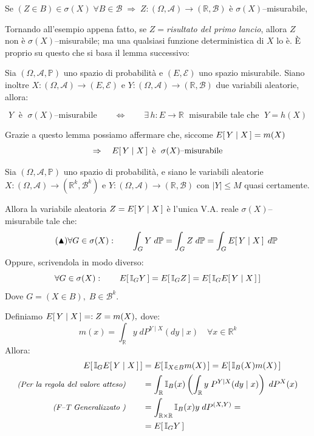 \begin{definizione}
    Se $(Z\in B)\in \sigma(X)\;\forall B\in\mathcal{B}\;\Rightarrow\;Z:(\Omega, \mathcal{A})\to (\mathbb{R}, \mathcal{B})$ è $\sigma(X)$--misurabile,
\end{definizione}

Tornando all'esempio appena fatto, se $Z=$\textit{risultato del primo lancio}, allora $Z$ non è $\sigma(X)$--misurabile; ma una qualsiasi funzione deterministica di $X$ lo è. È proprio su questo che si basa il lemma successivo:

\begin{lemma}
    Sia $(\Omega, \mathcal{A}, \mathbb{P})$ uno spazio di probabilità e $(E, \mathcal{E})$ uno spazio misurabile. Siano inoltre $X:(\Omega, \mathcal{A})\to(E, \mathcal{E})$ e $Y:(\Omega, \mathcal{A})\to(\mathbb{R}, \mathcal{B})$ due variabili aleatorie, allora:

    \[Y \;\text{ è }\; \sigma(X)\text{--misurabile}\qquad \iff\qquad \exists \,h:E\to\mathbb{R}\;\text{ misurabile tale che }\; Y=h(X)\]
\end{lemma}
\noindent Grazie a questo lemma possiamo affermare che, siccome $E\!\left[\,Y\mid X\,\right] = m(X)$
\[\Rightarrow \quad E\!\left[\,Y\mid X\,\right] \text{ è }\; \sigma(X)\text{--misurabile}\]

\begin{proposizione}
    Sia $(\Omega, \mathcal{A}, \mathbb{P})$ uno spazio di probabilità, e siano le variabili aleatorie $X:(\Omega, \mathcal{A})\to(\mathbb{R}^k, \mathcal{B}^k)$ e $Y:(\Omega, \mathcal{A})\to(\mathbb{R}, \mathcal{B})$ con $|Y|\leq M$ quasi certamente. 
    
    \medskip
    \noindent Allora la variabile aleatoria $Z=E\!\left[\,Y\mid X\,\right]$ è l'unica V.A. reale $\sigma(X)$-- misurabile tale che:
    \begin{equation}
    \tag{\(\blacktriangle\)}
    \label{eq:14.8}
        \forall G\in \sigma(X):\qquad \int_G Y\;d\mathbb{P} = \int_G Z\;d\mathbb{P} = \int_G E\!\left[\,Y\mid X\,\right] \;d\mathbb{P} 
    \end{equation}
    Oppure, scrivendola in modo diverso:
    \[\forall G\in \sigma(X):\qquad E\!\left[\,\mathbb{I}_G Y\,\right] = E\!\left[\,\mathbb{I}_G Z\,\right] = E\!\left[\,\mathbb{I}_G E\!\left[\,Y\mid X\,\right]\,\right]\]
    Dove $G=(X\in B), \;B\in\mathcal{B}^k$.
    \begin{dimostrazione}
        Definiamo $E\!\left[\,Y\mid X\,\right] = :Z = m(X), $  dove:
        \[m(x) = \int_{\mathbb{R}}y\;dP^{Y\mid X}(dy\mid x)\quad \forall x\in\mathbb{R}^k\]
        Allora:
        \begin{align*}
            E\!\left[\,\mathbb{I}_GE\!\left[\,Y\mid X\,\right]\,\right] & = E\!\left[\,\mathbb{I}_{X\in B}m(X)\,\right] = E\!\left[\,\mathbb{I}_B(X) m(X)\,\right] \\
           \textit{\small (Per la regola del valore atteso)}\qquad & = \int_\mathbb{R}\mathbb{I}_B(x)\left(\int_\mathbb{R}y\;P^{Y\mid X}(dy\mid x)\right)\;dP^X(x) \\
           \textit{\small (F--T Generalizzato )}\qquad  & = \int_{\mathbb{R}\times \mathbb{R}} \mathbb{I}_B(x) y  \;dP^{(X, Y)} = \\
           & = E\!\left[\,\mathbb{I}_G Y\,\right]
        \end{align*}
    \end{dimostrazione}
\end{proposizione}

